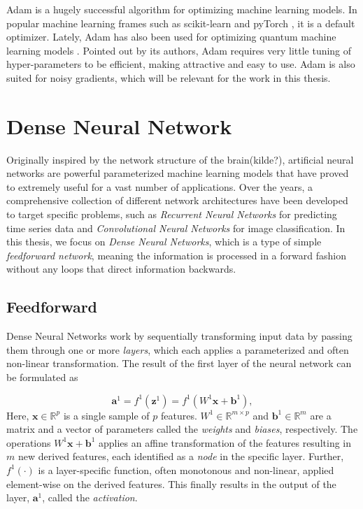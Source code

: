 Adam is a hugely successful algorithm for optimizing machine learning models. In popular machine learning frames such as scikit-learn \cite{scikit-learn} and pyTorch \cite{pytorch}, it is a default optimizer. Lately, Adam has also been used for optimizing quantum machine learning models \cite{abbas2020power, skolik2020layerwise}. Pointed out by its authors, Adam requires very little tuning of hyper-parameters to be efficient, making attractive and easy to use. Adam is also suited for noisy gradients, which will be relevant for the work in this thesis. 



\section{Dense Neural Network}\label{sec:DenseNeuralNetwork}
Originally inspired by the network structure of the brain(kilde?), artificial neural networks are powerful parameterized machine learning models that have proved to extremely useful for a vast number of applications. Over the years, a comprehensive collection of different network architectures have been developed to target specific problems, such as \emph{Recurrent Neural Networks} for predicting time series data and \emph{Convolutional Neural Networks} for image classification. In this thesis, we focus on \emph{Dense Neural Networks}, which is a type of simple \emph{feedforward network}, meaning the information is processed in a forward fashion without any loops that direct information backwards.

\subsection{Feedforward}\label{sec:FeedforwardDNN}
Dense Neural Networks work by sequentially transforming input data by passing them through one or more \emph{layers}, which each applies a parameterized and often non-linear transformation. The result of the first layer of the neural network can be formulated as

\begin{equation}\label{eq:FeedforwardSingle}
    \boldsymbol{a}^1 = f^1(\boldsymbol{z}^1) = f^1(W^1 \boldsymbol{x} + \boldsymbol{b}^1),
\end{equation}
Here, $\boldsymbol{x} \in \mathbb{R}^p$ is a single sample of $p$ features. $W^1 \in \mathbb{R}^{m \times p}$ and $\boldsymbol{b}^1 \in \mathbb{R}^{m}$ are a matrix and a vector of parameters called the \emph{weights} and \emph{biases}, respectively. The operations $W^1 \boldsymbol{x} + \boldsymbol{b}^1$ applies an affine transformation of the features resulting in $m$ new derived features, each identified as a \emph{node} in the specific layer. Further, $f^1(\cdot)$ is a layer-specific function, often monotonous and non-linear, applied element-wise on the derived features. This finally results in the output of the layer, $\boldsymbol{a}^1$, called the \emph{activation}.

